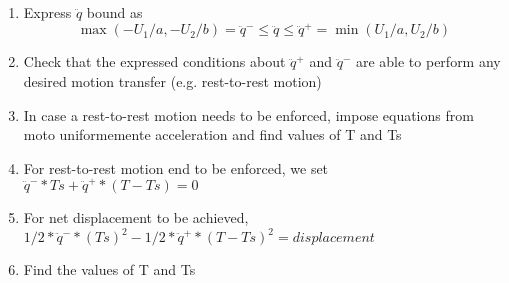 \documentclass[a4paper,12pt]{article}
\begin{document}
\begin{enumerate}
\begin{enumerate}
 \item Express $\ddot{q}$ bound as 
 \begin{equation}
    \max(-U_1/a, -U_2/b) = \ddot{q}^{-} \leq \ddot{q} \leq \ddot{q}^{+} = \min(U_1/a, U_2/b)
 \end{equation}
 \item Check that the expressed conditions about $\ddot{q}^{+}$ and $\ddot{q}^{-}$
  are able to perform any desired motion transfer (e.g. rest-to-rest motion)
 \item In case a rest-to-rest motion needs to be
  enforced, impose equations from moto uniformemente 
  acceleration and find values of T and Ts
 \item For rest-to-rest motion end to be enforced, 
 we set $\ddot{q}^{-}*Ts + \ddot{q}^{+} *(T-Ts) = 0$
 \item For net displacement to be 
 achieved, $1/2*\ddot{q}^{-}*(Ts)^2 - 1/2*\ddot{q}^{+}*(T-Ts)^2 = displacement$
 \item Find the values of T and Ts
\end{enumerate}

\end{enumerate}
\end{document}
